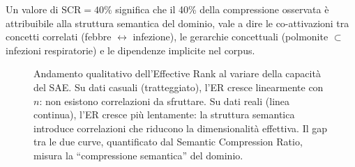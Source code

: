 Un valore di $\text{SCR} = 40\%$ significa che il 40\% della compressione osservata è attribuibile alla struttura semantica del dominio, vale a dire le co-attivazioni tra concetti correlati (febbre $\leftrightarrow$ infezione), le gerarchie concettuali (polmonite $\subset$ infezioni respiratorie) e le dipendenze implicite nel corpus.

\begin{figure}[htbp]
    \centering
    \caption{Andamento qualitativo dell'Effective Rank al variare della capacità del SAE. Su dati casuali (tratteggiato), l'ER cresce linearmente con $n$: non esistono correlazioni da sfruttare. Su dati reali (linea continua), l'ER cresce più lentamente: la struttura semantica introduce correlazioni che riducono la dimensionalità effettiva. Il gap tra le due curve, quantificato dal Semantic Compression Ratio, misura la ``compressione semantica'' del dominio.}
    \label{fig:er_scaling}
\end{figure}
